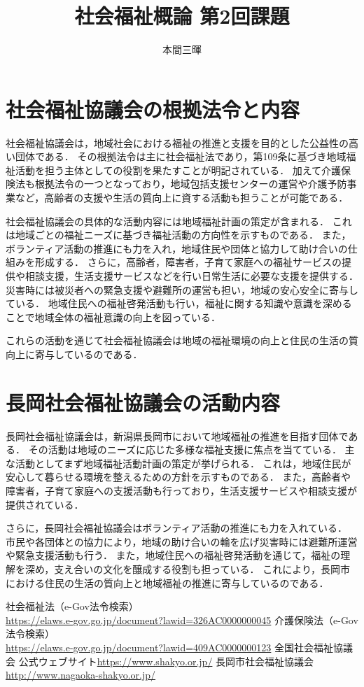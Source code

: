 \documentclass[titlepage,a4paper]{jsarticle}
\title{社会福祉概論 第2回課題}
\author{本間三暉}
\begin{document}
\maketitle
\section{社会福祉協議会の根拠法令と内容}
社会福祉協議会は，地域社会における福祉の推進と支援を目的とした公益性の高い団体である．
その根拠法令は主に社会福祉法であり，第109条に基づき地域福祉活動を担う主体としての役割を果たすことが明記されている．
加えて介護保険法も根拠法令の一つとなっており，地域包括支援センターの運営や介護予防事業など，高齢者の支援や生活の質向上に資する活動も担うことが可能である．

社会福祉協議会の具体的な活動内容には地域福祉計画の策定が含まれる．
これは地域ごとの福祉ニーズに基づき福祉活動の方向性を示すものである．
また，ボランティア活動の推進にも力を入れ，地域住民や団体と協力して助け合いの仕組みを形成する．
さらに，高齢者，障害者，子育て家庭への福祉サービスの提供や相談支援，生活支援サービスなどを行い日常生活に必要な支援を提供する．
災害時には被災者への緊急支援や避難所の運営も担い，地域の安心安全に寄与している．
地域住民への福祉啓発活動も行い，福祉に関する知識や意識を深めることで地域全体の福祉意識の向上を図っている．

これらの活動を通じて社会福祉協議会は地域の福祉環境の向上と住民の生活の質向上に寄与しているのである．
\section{長岡社会福祉協議会の活動内容}
長岡社会福祉協議会は，新潟県長岡市において地域福祉の推進を目指す団体である．
その活動は地域のニーズに応じた多様な福祉支援に焦点を当てている．
主な活動としてまず地域福祉活動計画の策定が挙げられる．
これは，地域住民が安心して暮らせる環境を整えるための方針を示すものである．
また，高齢者や障害者，子育て家庭への支援活動も行っており，生活支援サービスや相談支援が提供されている．

さらに，長岡社会福祉協議会はボランティア活動の推進にも力を入れている．
市民や各団体との協力により，地域の助け合いの輪を広げ災害時には避難所運営や緊急支援活動も行う．
また，地域住民への福祉啓発活動を通じて，福祉の理解を深め，支え合いの文化を醸成する役割も担っている．
これにより，長岡市における住民の生活の質向上と地域福祉の推進に寄与しているのである．

\begin{thebibliography}{99}
  社会福祉法（e-Gov法令検索）\\\url{https://elaws.e-gov.go.jp/document?lawid=326AC0000000045}
  介護保険法（e-Gov法令検索）\\\url{https://elaws.e-gov.go.jp/document?lawid=409AC0000000123}
  全国社会福祉協議会 公式ウェブサイト\url{https://www.shakyo.or.jp/}
  長岡市社会福祉協議会\url{http://www.nagaoka-shakyo.or.jp/}
\end{thebibliography}
\end{document}
